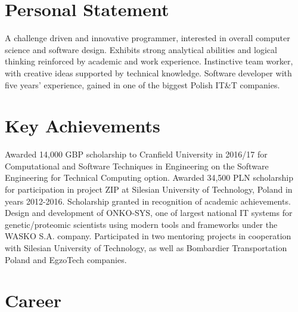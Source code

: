 \documentclass[12pt,english]{resume}
\begin{document}

	
	\section{Personal Statement}
		A challenge driven and innovative programmer, interested in overall computer
		science and software design. Exhibits strong analytical abilities and logical
		thinking reinforced by academic and work experience. Instinctive team worker,
		with creative ideas supported by technical knowledge. Software developer with
		five years’ experience, gained in one of the biggest Polish IT\&T companies.

	\section{Key Achievements}
		Awarded 14,000 GBP scholarship to Cranfield University in 2016/17 for Computational and Software Techniques in Engineering on the Software Engineering for Technical Computing option.
		Awarded 34,500 PLN scholarship for participation in project ZIP at Silesian University of Technology, Poland in years 2012-2016. Scholarship granted in recognition of academic achievements.
		Design and development of ONKO-SYS, one of largest national IT systems for genetic/proteomic scientists using modern tools and frameworks under the WASKO S.A. company.
		Participated in two mentoring projects in cooperation with Silesian University of Technology, as well as Bombardier Transportation Poland and EgzoTech companies.

	\section{Career}

		
\end{document}
